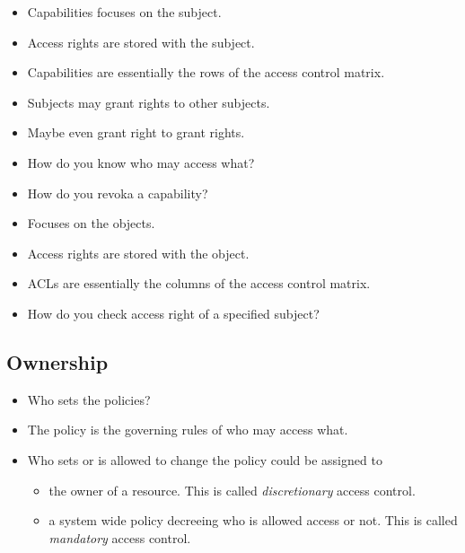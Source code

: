 \begin{frame}
  \begin{itemize}
    \item Capabilities focuses on the subject.
    \item Access rights are stored with the subject.
    \item Capabilities are essentially the rows of the access control matrix.
    \item Subjects may grant rights to other subjects.
    \item Maybe even grant right to grant rights.

    \item How do you know who may access what?
    \item How do you revoka a capability?
  \end{itemize}
\end{frame}

\begin{frame}
  \begin{itemize}
    \item Focuses on the objects.
    \item Access rights are stored with the object.
    \item ACLs are essentially the columns of the access control matrix.

    \item How do you check access right of a specified subject?
  \end{itemize}
\end{frame}

\subsection{Ownership}

\begin{frame}
  \begin{itemize}
    \item Who sets the policies?

    \item The policy is the governing rules of who may access what.

    \item Who sets or is allowed to change the policy could be assigned to
      \begin{itemize}
        \item the owner of a resource.
          This is called \emph{discretionary} access control.

        \item a system wide policy decreeing who is allowed access or not.
          This is called \emph{mandatory} access control.

      \end{itemize}
  \end{itemize}
\end{frame}


